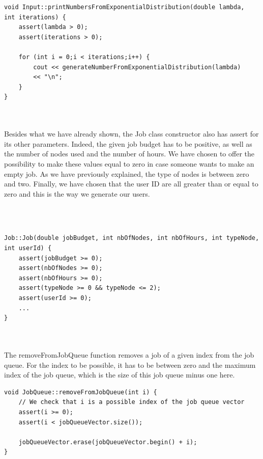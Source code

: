 \documentclass [10 pt, a4 paper]{report}
\begin{document}
\begin{lstlisting}[caption=printNumbersFromExponentialDistribution function of the class Input, label={lst:code1}, frame=single]
void Input::printNumbersFromExponentialDistribution(double lambda,
int iterations) {
	assert(lambda > 0);
	assert(iterations > 0);

	for (int i = 0;i < iterations;i++) {
		cout << generateNumberFromExponentialDistribution(lambda) 
		<< "\n";
	}
}
\end{lstlisting}


\noindent
\\ \\
Besides what we have already shown, the Job class constructor also has assert for its other parameters. Indeed, the given job budget has to be positive, as well as the number of nodes used and the number of hours. We have chosen to offer the possibility to make these values equal to zero in case someone wants to make an empty job. As we have previously explained, the type of nodes is between zero and two. Finally, we have chosen that the user ID are all greater than or equal to zero and this is the way we generate our users.

\\ \\

\begin{lstlisting}[caption=Job function of the class Job, label={lst:code1}, frame=single]
Job::Job(double jobBudget, int nbOfNodes, int nbOfHours, int typeNode, int userId) {
	assert(jobBudget >= 0);
	assert(nbOfNodes >= 0);
	assert(nbOfHours >= 0);
	assert(typeNode >= 0 && typeNode <= 2);
	assert(userId >= 0);
	...
}
\end{lstlisting}


\noindent
\\ \\
The removeFromJobQueue function removes a job of a given index from the job queue. For the index to be possible, it has to be between zero and the maximum index of the job queue, which is the size of this job queue minus one here.


\begin{lstlisting}[caption=removeFromJobQueue function of the class JobQueue, label={lst:code1}, frame=single]
void JobQueue::removeFromJobQueue(int i) {
	// We check that i is a possible index of the job queue vector
	assert(i >= 0);
	assert(i < jobQueueVector.size());

	jobQueueVector.erase(jobQueueVector.begin() + i);
}
\end{lstlisting}
\end{document}
